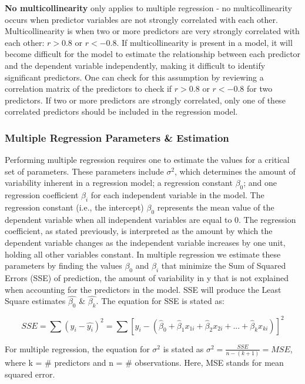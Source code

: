 \documentclass[
]{article}
\begin{document}
\textbf{No multicollinearity} only applies to multiple regression - no
multicollinearity occurs when predictor variables are not strongly
correlated with each other. Multicollinearity is when two or more
predictors are very strongly correlated with each other: \(r > 0.8\) or
\(r < -0.8\). If multicollinearity is present in a model, it will become
difficult for the model to estimate the relationship between each
predictor and the dependent variable independently, making it difficult
to identify significant predictors. One can check for this assumption by
reviewing a correlation matrix of the predictors to check if \(r > 0.8\)
or \(r < -0.8\) for two predictors. If two or more predictors are
strongly correlated, only one of these correlated predictors should be
included in the regression model.

\hypertarget{multiple-regression-parameters-estimation}{%
\subsubsection{Multiple Regression Parameters \&
Estimation}\label{multiple-regression-parameters-estimation}}

Performing multiple regression requires one to estimate the values for a
critical set of parameters. These parameters include \(σ^2\), which
determines the amount of variability inherent in a regression model; a
regression constant \(β_0\); and one regression coefficient \(β_i\) for
each independent variable in the model. The regression constant (i.e.,
the intercept) \(β_0\) represents the mean value of the dependent
variable when all independent variables are equal to 0. The regression
coefficient, as stated previously, is interpreted as the amount by which
the dependent variable changes as the independent variable increases by
one unit, holding all other variables constant. In multiple regression
we estimate these parameters by finding the values \(β_0\) and \(β_i\)
that minimize the Sum of Squared Errors (SSE) of prediction, the amount
of variability in y that is not explained when accounting for the
predictors in the model. SSE will produce the Least Square estimates
\(\widehat{\beta_0}\) \& \(\widehat{\beta_k}\). The equation for SSE is
stated as:

\[SSE = \sum(y_i - \hat{y_i})^2 = \sum[y_i - (\hat\beta_0 + \hat\beta_1x_{1i} + \hat\beta_2x_{2i} + ... + \hat\beta_kx_{ki})]^2 \]

For multiple regression, the equation for \(σ^2\) is stated as
\(σ^2 = \frac{SSE}{n-(k+1)} = MSE\), where k = \# predictors and n = \#
observations. Here, MSE stands for mean squared error.
\end{document}

